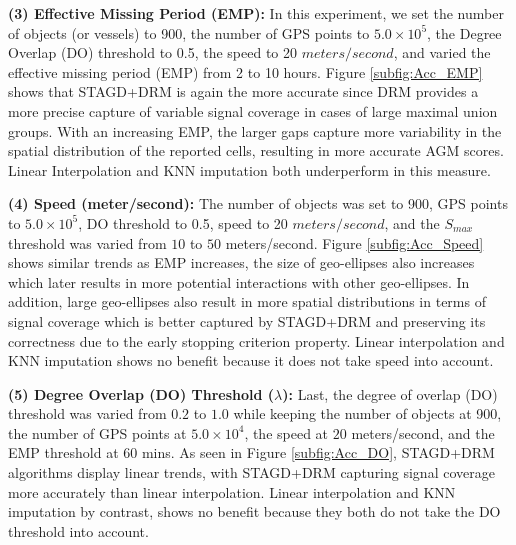 \documentclass[acmsmall]{acmart}
\begin{document}
\textbf{(3) Effective Missing Period (EMP):} In this experiment, we set the number of objects (or vessels) to 900, the number of GPS points to $5.0 \times 10^{5}$, the Degree Overlap (DO) threshold to 0.5, the speed to 20 $meters/second$, and varied the effective missing period (EMP) from 2 to 10 hours. Figure \ref{subfig:Acc_EMP} shows that STAGD+DRM is again the more accurate since DRM provides a more precise capture of variable signal coverage in cases of large maximal union groups. With an increasing EMP, the larger gaps capture more variability in the spatial distribution of the reported cells, resulting in more accurate AGM scores. Linear Interpolation and KNN imputation both underperform in this measure.

\textbf{(4) Speed (meter/second):} The number of objects was set to 900, GPS points to $5.0 \times 10^{5}$, DO threshold to 0.5, speed to 20 $meters/second$, and the $S_{max}$ threshold was varied from $10$ to $50$ meters/second. Figure \ref{subfig:Acc_Speed} shows similar trends as EMP increases, the size of geo-ellipses also increases which later results in more potential interactions with other geo-ellipses. In addition, large geo-ellipses also result in more spatial distributions in terms of signal coverage which is better captured by STAGD+DRM and preserving its correctness due to the early stopping criterion property. Linear interpolation and KNN imputation shows no benefit because it does not take speed into account.

\textbf{(5) Degree Overlap (DO) Threshold ($\lambda$):} Last, the degree of overlap (DO) threshold was varied from $0.2$ to $1.0$ while keeping the number of objects at 900, the number of GPS points at $5.0 \times 10^{4}$, the speed at $20$ meters/second, and the EMP threshold at 60 mins. As seen in Figure \ref{subfig:Acc_DO}, STAGD+DRM algorithms display linear trends, with STAGD+DRM capturing signal coverage more accurately than linear interpolation. Linear interpolation and KNN imputation by contrast, shows no benefit because they both do not take the DO threshold into account.\\
\end{document}
